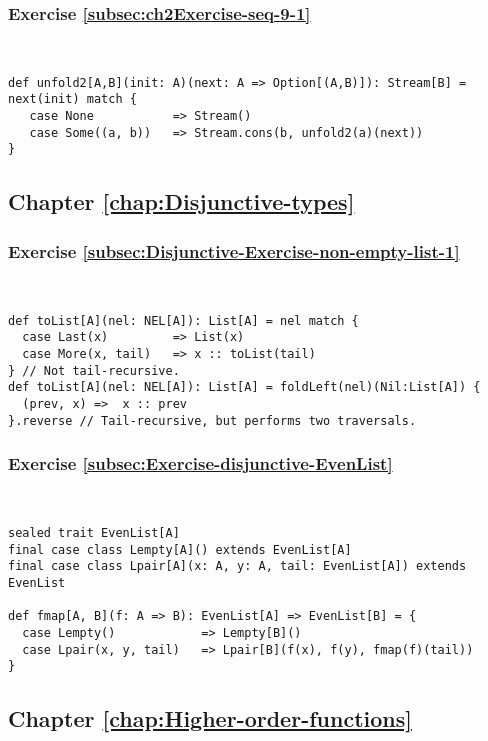 \subsubsection*{Exercise \ref{subsec:ch2Exercise-seq-9-1}}

~
\begin{lstlisting}
def unfold2[A,B](init: A)(next: A => Option[(A,B)]): Stream[B] = next(init) match {
   case None           => Stream()
   case Some((a, b))   => Stream.cons(b, unfold2(a)(next))
}
\end{lstlisting}


\subsection*{Chapter \ref{chap:Disjunctive-types}}

\subsubsection*{Exercise \ref{subsec:Disjunctive-Exercise-non-empty-list-1}}

~
\begin{lstlisting}
def toList[A](nel: NEL[A]): List[A] = nel match {
  case Last(x)         => List(x)
  case More(x, tail)   => x :: toList(tail)
} // Not tail-recursive.
def toList[A](nel: NEL[A]): List[A] = foldLeft(nel)(Nil:List[A]) {
  (prev, x) =>  x :: prev
}.reverse // Tail-recursive, but performs two traversals.
\end{lstlisting}


\subsubsection*{Exercise \ref{subsec:Exercise-disjunctive-EvenList}}

~
\begin{lstlisting}
sealed trait EvenList[A]
final case class Lempty[A]() extends EvenList[A]
final case class Lpair[A](x: A, y: A, tail: EvenList[A]) extends EvenList

def fmap[A, B](f: A => B): EvenList[A] => EvenList[B] = {
  case Lempty()            => Lempty[B]()
  case Lpair(x, y, tail)   => Lpair[B](f(x), f(y), fmap(f)(tail))
}
\end{lstlisting}


\subsection*{Chapter \ref{chap:Higher-order-functions}}

